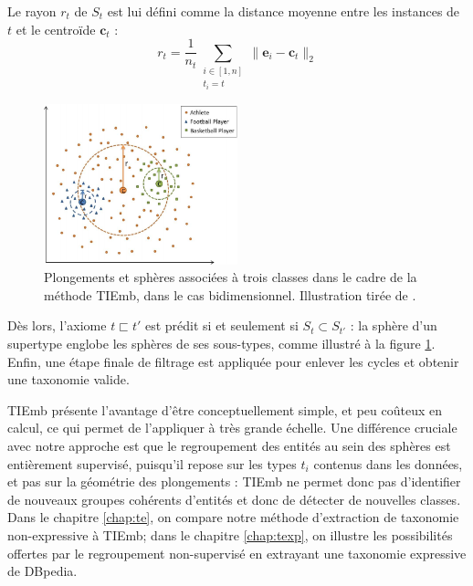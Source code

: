 Le rayon $r_t$ de $S_t$ est lui défini comme la distance moyenne entre les instances de $t$ et le centroïde $\textbf{c}_t$ :
\begin{equation}
    r_t = \frac{1}{n_t}  \sum_{\substack{i \in [1, n] \\ t_i = t}} \| \textbf{e}_i - \textbf{c}_t \|_2
\end{equation}


\begin{figure}[h]
    \centering
    \includegraphics[width=0.5\textwidth]{img/tiemb.png}
    \caption[Principe général de TIEmb]{Plongements et sphères associées à trois classes dans le cadre de la méthode TIEmb, dans le cas bidimensionnel. Illustration tirée de \cite{ristoski2017large}.}
    \label{fig:litt-tiemb}
\end{figure}


Dès lors, l'axiome $t \sqsubset t'$ est prédit si et seulement si $S_t \subset S_{t'}$ : la sphère d'un supertype englobe les sphères de ses sous-types, comme illustré à la figure \ref{fig:litt-tiemb}. Enfin, une étape finale de filtrage est appliquée pour enlever les cycles et obtenir une taxonomie valide. 

TIEmb présente l'avantage d'être conceptuellement simple, et peu coûteux en calcul, ce qui permet de l'appliquer à très grande échelle. Une différence cruciale avec notre approche est que le regroupement des entités au sein des sphères est entièrement supervisé, puisqu'il repose sur les types $t_i$ contenus dans les données, et pas sur la géométrie des plongements : TIEmb ne permet donc pas d'identifier de nouveaux groupes cohérents d'entités et donc de détecter de nouvelles classes. Dans le chapitre \ref{chap:te}, on compare notre méthode d'extraction de taxonomie non-expressive à TIEmb; dans le chapitre \ref{chap:texp}, on illustre les possibilités offertes par le regroupement non-supervisé en extrayant une taxonomie expressive de DBpedia.

